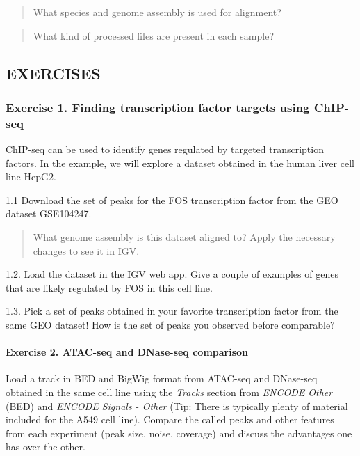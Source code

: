 \documentclass[
]{book}
\begin{document}
\begin{quote}
What species and genome assembly is used for alignment?
\end{quote}

\begin{quote}
What kind of processed files are present in each sample?
\end{quote}

\hypertarget{exercises-4}{%
\subsection{EXERCISES}\label{exercises-4}}

\hypertarget{exercise-1.-finding-transcription-factor-targets-using-chip-seq}{%
\subsubsection{Exercise 1. Finding transcription factor targets using ChIP-seq}\label{exercise-1.-finding-transcription-factor-targets-using-chip-seq}}

ChIP-seq can be used to identify genes regulated by targeted transcription factors. In the example, we will explore a dataset obtained in the human liver cell line HepG2.

1.1 Download the set of peaks for the FOS transcription factor from the GEO dataset GSE104247.

\begin{quote}
What genome assembly is this dataset aligned to? Apply the necessary changes to see it in IGV.
\end{quote}

1.2. Load the dataset in the IGV web app. Give a couple of examples of genes that are likely regulated by FOS in this cell line.

1.3. Pick a set of peaks obtained in your favorite transcription factor from the same GEO dataset! How is the set of peaks you observed before comparable?

\hypertarget{exercise-2.-atac-seq-and-dnase-seq-comparison}{%
\paragraph{Exercise 2. ATAC-seq and DNase-seq comparison}\label{exercise-2.-atac-seq-and-dnase-seq-comparison}}

Load a track in BED and BigWig format from ATAC-seq and DNase-seq obtained in the same cell line using the \emph{Tracks} section from \emph{ENCODE Other} (BED) and \emph{ENCODE Signals - Other} (Tip: There is typically plenty of material included for the A549 cell line). Compare the called peaks and other features from each experiment (peak size, noise, coverage) and discuss the advantages one has over the other.
\end{document}
